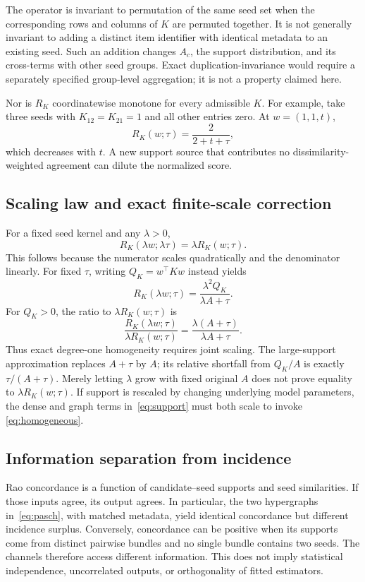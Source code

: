 \documentclass[11pt,a4paper]{article}
\theoremstyle{remark}
\begin{document}
The operator is invariant to permutation of the same seed set when the
corresponding rows and columns of $K$ are permuted together. It is not
generally invariant to adding a distinct item identifier with identical
metadata to an existing seed. Such an addition changes $A_c$, the support
distribution, and its cross-terms with other seed groups. Exact
duplication-invariance would require a separately specified group-level
aggregation; it is not a property claimed here.

Nor is $R_K$ coordinatewise monotone for every admissible $K$. For example,
take three seeds with $K_{12}=K_{21}=1$ and all other entries zero.
At $w=(1,1,t)$,
\begin{equation}
 R_K(w;\tau)=\frac{2}{2+t+\tau},
\end{equation}
which decreases with $t$. A new support source that contributes no
dissimilarity-weighted agreement can dilute the normalized score.

\subsection{Scaling law and exact finite-scale correction}
For a fixed seed kernel and any $\lambda>0$,
\begin{equation}
 R_K(\lambda w;\lambda\tau)=\lambda R_K(w;\tau).
 \label{eq:homogeneous}
\end{equation}
This follows because the numerator scales quadratically and the denominator
linearly. For fixed $\tau$, writing $Q_K=w^\top Kw$ instead yields
\begin{equation}
 R_K(\lambda w;\tau)=\frac{\lambda^2 Q_K}{\lambda A+\tau}.
 \label{eq:fixedtau}
\end{equation}
For $Q_K>0$, the ratio to $\lambda R_K(w;\tau)$ is
\begin{equation}
 \frac{R_K(\lambda w;\tau)}{\lambda R_K(w;\tau)}
 =\frac{\lambda(A+\tau)}{\lambda A+\tau}.
\end{equation}
Thus exact degree-one homogeneity requires joint scaling. The large-support
approximation replaces $A+\tau$ by $A$; its relative shortfall from
$Q_K/A$ is exactly $\tau/(A+\tau)$. Merely letting $\lambda$ grow with
fixed original $A$ does not prove equality to $\lambda R_K(w;\tau)$.
If support is rescaled by changing underlying model parameters, the dense
and graph terms in~\eqref{eq:support} must both scale to invoke
\eqref{eq:homogeneous}.

\subsection{Information separation from incidence}
Rao concordance is a function of candidate--seed supports and seed
similarities. If those inputs agree, its output agrees. In particular,
the two hypergraphs in~\eqref{eq:pasch}, with matched metadata, yield
identical concordance but different incidence surplus. Conversely,
concordance can be positive when its supports come from distinct pairwise
bundles and no single bundle contains two seeds. The channels therefore
access different information. This does not imply statistical independence,
uncorrelated outputs, or orthogonality of fitted estimators.
\end{document}
